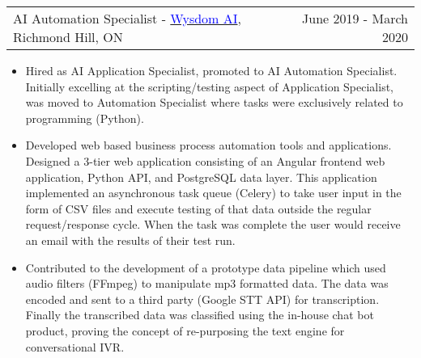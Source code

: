 \documentclass[margin]{res}
\begin{document}
\begin{resume}
	\begin{tabular}{p{3in} r} %
		AI Automation Specialist - \href{https://wysdom.ai}{\textcolor{blue}{Wysdom AI}}, Richmond Hill, ON & June 2019 - March 2020
	\end{tabular}
	\begin{itemize} %
		\item Hired as AI Application Specialist, promoted to AI Automation Specialist. Initially
		      excelling at the scripting/testing aspect of Application Specialist, was moved to
		      Automation Specialist where tasks were exclusively related to programming (Python).
		\item Developed web based business process automation tools and applications. Designed a 3-tier
		      web application consisting of an Angular frontend web application, Python API, and PostgreSQL
		      data layer. This application implemented an asynchronous task queue (Celery) to take user input
		      in the form of CSV files and execute testing of that data outside the regular request/response cycle.
		      When the task was complete the user would receive an email with the results of their test run.
		\item Contributed to the development of a prototype data pipeline which used audio filters
		      (FFmpeg) to manipulate mp3 formatted data. The data was
		      encoded and sent to a third party (Google STT API) for transcription.
		      Finally the transcribed data was classified using the in-house chat bot product,
		      proving the concept of re-purposing the text engine for conversational IVR.

	\end{itemize}

\end{resume}
\end{document}
